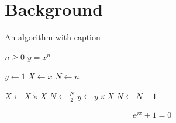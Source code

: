 
\chapter{Background}
\label{chp:background}

\begin{algorithm}[ht]
    \caption{An algorithm with caption}\label{alg:two}
    \begin{algorithmic}
        \REQUIRE $n \geq 0$
        \ENSURE $y = x^n$
        
        \STATE $y \gets 1$
        \STATE $X \gets x$
        \STATE $N \gets n$
        
              \STATE $X \gets X \times X$
              \STATE $N \gets \frac{N}{2} $  
              \STATE $y \gets y \times X$
              \STATE $N \gets N - 1$
            \ENDIF
        \ENDWHILE
    \end{algorithmic}
\end{algorithm}

\begin{equation}
e^{j\pi} + 1 = 0
\end{equation}
